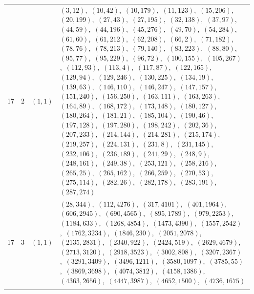 \documentclass[11pt]{article}
\begin{document}
\begin{longtable}{@{}rrl>{\raggedright\arraybackslash}p{}@{}}
17 & 2 & $(1,1)$ & $(3,12)$,\allowbreak\ $(10,42)$,\allowbreak\ $(10,179)$,\allowbreak\ $(11,123)$,\allowbreak\ $(15,206)$,\allowbreak\ $(20,199)$,\allowbreak\ $(27,43)$,\allowbreak\ $(27,195)$,\allowbreak\ $(32,138)$,\allowbreak\ $(37,97)$,\allowbreak\ $(44,59)$,\allowbreak\ $(44,196)$,\allowbreak\ $(45,276)$,\allowbreak\ $(49,70)$,\allowbreak\ $(54,284)$,\allowbreak\ $(61,60)$,\allowbreak\ $(61,212)$,\allowbreak\ $(62,208)$,\allowbreak\ $(66,2)$,\allowbreak\ $(71,182)$,\allowbreak\ $(78,76)$,\allowbreak\ $(78,213)$,\allowbreak\ $(79,140)$,\allowbreak\ $(83,223)$,\allowbreak\ $(88,80)$,\allowbreak\ $(95,77)$,\allowbreak\ $(95,229)$,\allowbreak\ $(96,72)$,\allowbreak\ $(100,155)$,\allowbreak\ $(105,267)$,\allowbreak\ $(112,93)$,\allowbreak\ $(113,4)$,\allowbreak\ $(117,87)$,\allowbreak\ $(122,165)$,\allowbreak\ $(129,94)$,\allowbreak\ $(129,246)$,\allowbreak\ $(130,225)$,\allowbreak\ $(134,19)$,\allowbreak\ $(139,63)$,\allowbreak\ $(146,110)$,\allowbreak\ $(146,247)$,\allowbreak\ $(147,157)$,\allowbreak\ $(151,240)$,\allowbreak\ $(156,250)$,\allowbreak\ $(163,111)$,\allowbreak\ $(163,263)$,\allowbreak\ $(164,89)$,\allowbreak\ $(168,172)$,\allowbreak\ $(173,148)$,\allowbreak\ $(180,127)$,\allowbreak\ $(180,264)$,\allowbreak\ $(181,21)$,\allowbreak\ $(185,104)$,\allowbreak\ $(190,46)$,\allowbreak\ $(197,128)$,\allowbreak\ $(197,280)$,\allowbreak\ $(198,242)$,\allowbreak\ $(202,36)$,\allowbreak\ $(207,233)$,\allowbreak\ $(214,144)$,\allowbreak\ $(214,281)$,\allowbreak\ $(215,174)$,\allowbreak\ $(219,257)$,\allowbreak\ $(224,131)$,\allowbreak\ $(231,8)$,\allowbreak\ $(231,145)$,\allowbreak\ $(232,106)$,\allowbreak\ $(236,189)$,\allowbreak\ $(241,29)$,\allowbreak\ $(248,9)$,\allowbreak\ $(248,161)$,\allowbreak\ $(249,38)$,\allowbreak\ $(253,121)$,\allowbreak\ $(258,216)$,\allowbreak\ $(265,25)$,\allowbreak\ $(265,162)$,\allowbreak\ $(266,259)$,\allowbreak\ $(270,53)$,\allowbreak\ $(275,114)$,\allowbreak\ $(282,26)$,\allowbreak\ $(282,178)$,\allowbreak\ $(283,191)$,\allowbreak\ $(287,274)$\\
17 & 3 & $(1,1)$ & $(28,344)$,\allowbreak\ $(112,4276)$,\allowbreak\ $(317,4101)$,\allowbreak\ $(401,1964)$,\allowbreak\ $(606,2945)$,\allowbreak\ $(690,4565)$,\allowbreak\ $(895,1789)$,\allowbreak\ $(979,2253)$,\allowbreak\ $(1184,633)$,\allowbreak\ $(1268,4854)$,\allowbreak\ $(1473,4390)$,\allowbreak\ $(1557,2542)$,\allowbreak\ $(1762,3234)$,\allowbreak\ $(1846,230)$,\allowbreak\ $(2051,2078)$,\allowbreak\ $(2135,2831)$,\allowbreak\ $(2340,922)$,\allowbreak\ $(2424,519)$,\allowbreak\ $(2629,4679)$,\allowbreak\ $(2713,3120)$,\allowbreak\ $(2918,3523)$,\allowbreak\ $(3002,808)$,\allowbreak\ $(3207,2367)$,\allowbreak\ $(3291,3409)$,\allowbreak\ $(3496,1211)$,\allowbreak\ $(3580,1097)$,\allowbreak\ $(3785,55)$,\allowbreak\ $(3869,3698)$,\allowbreak\ $(4074,3812)$,\allowbreak\ $(4158,1386)$,\allowbreak\ $(4363,2656)$,\allowbreak\ $(4447,3987)$,\allowbreak\ $(4652,1500)$,\allowbreak\ $(4736,1675)$\\
\addlinespace[3pt]
\end{longtable}
\endgroup
\end{document}
